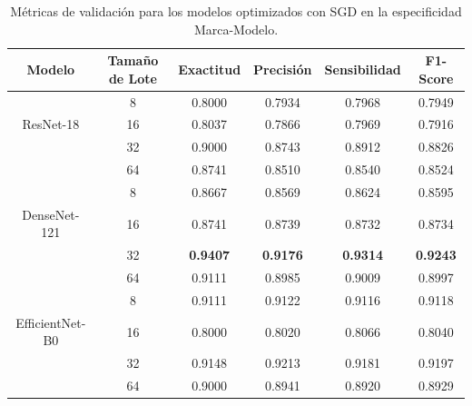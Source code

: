 \begin{table}[H]
	\centering
	\begin{adjustbox}{width=\textwidth}
		\begin{tabular}{|c|c|c|c|c|c|}
			\hline
			\textbf{Modelo} & \textbf{Tamaño de Lote} & \textbf{Exactitud} & \textbf{Precisión} & \textbf{Sensibilidad} & \textbf{F1-Score} \\
			\hline
			& 8 & 0.8000 & 0.7934 & 0.7968 & 0.7949 \\ \cline{2-6}
			ResNet-18 & 16 & 0.8037 & 0.7866 & 0.7969 & 0.7916 \\ \cline{2-6}
			& 32 & 0.9000 & 0.8743 & 0.8912 & 0.8826 \\ \cline{2-6}
			& 64 & 0.8741 & 0.8510 & 0.8540 & 0.8524 \\
			\hline
			& 8 & 0.8667 & 0.8569 & 0.8624 & 0.8595 \\ \cline{2-6}
			DenseNet-121 & 16 & 0.8741 & 0.8739 & 0.8732 & 0.8734 \\ \cline{2-6}
			& 32 & \textbf{0.9407} & \textbf{0.9176} & \textbf{0.9314} & \textbf{0.9243} \\ \cline{2-6}
			& 64 & 0.9111 & 0.8985 & 0.9009 & 0.8997 \\
			\hline
			& 8 & 0.9111 & 0.9122 & 0.9116 & 0.9118 \\ \cline{2-6}
			EfficientNet-B0 & 16 & 0.8000 & 0.8020 & 0.8066 & 0.8040 \\ \cline{2-6}
			& 32 & 0.9148 & 0.9213 & 0.9181 & 0.9197 \\ \cline{2-6}
			& 64 & 0.9000 & 0.8941 & 0.8920 & 0.8929 \\
			\hline
		\end{tabular}
	\end{adjustbox}
	\caption{Métricas de validación para los modelos optimizados con SGD en la especificidad Marca-Modelo.}
	\label{tab:sgd_metrics_mm}
\end{table}

